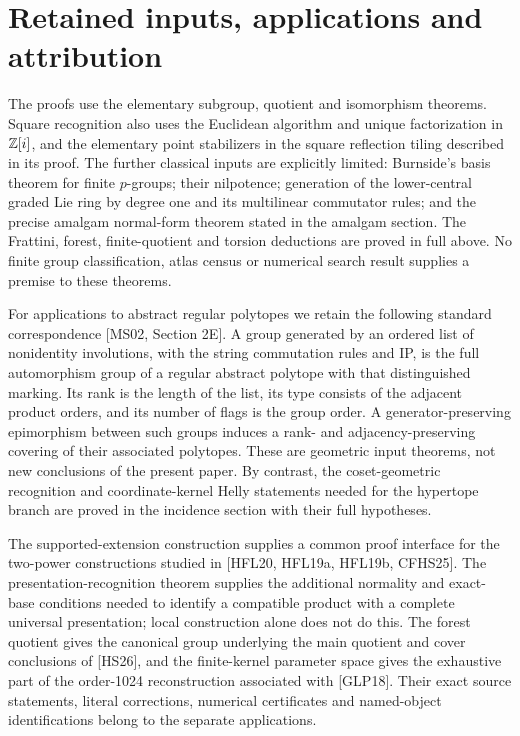 \section{Retained inputs, applications and attribution}\label{retained-inputs-applications-and-attribution}

The proofs use the elementary subgroup, quotient and isomorphism
theorems. Square recognition also uses the Euclidean algorithm and unique
factorization in $\mathbb Z[i]$, and the elementary point stabilizers in the
square reflection tiling described in its proof. The further classical
inputs are explicitly limited:
Burnside's basis theorem for finite \(p\)-groups; their nilpotence;
generation of the lower-central graded Lie ring by degree one and its
multilinear commutator rules; and the precise amalgam normal-form
theorem stated in the amalgam section. The Frattini, forest, finite-quotient and
torsion deductions are proved in full above. No finite group
classification, atlas census or numerical search result supplies a
premise to these theorems.

For applications to abstract regular polytopes we retain the following
standard correspondence {[}MS02, Section 2E{]}. A group generated by an
ordered list of nonidentity involutions, with the string commutation
rules and IP, is the full automorphism group of a regular abstract
polytope with that distinguished marking. Its rank is the length of the
list, its type consists of the adjacent product orders, and its number
of flags is the group order. A generator-preserving epimorphism between
such groups induces a rank- and adjacency-preserving covering of their
associated polytopes. These are geometric input theorems, not new
conclusions of the present paper. By contrast, the coset-geometric
recognition and coordinate-kernel Helly statements needed for the
hypertope branch are proved in the incidence section with their full hypotheses.

The supported-extension construction supplies a common proof interface
for the two-power constructions studied in {[}HFL20, HFL19a, HFL19b,
CFHS25{]}. The presentation-recognition theorem supplies the additional normality and
exact-base conditions needed to identify a compatible product with a complete
universal presentation; local construction alone does not do this.
The forest quotient gives the canonical group underlying the main
quotient and cover conclusions of {[}HS26{]}, and the finite-kernel
parameter space gives the exhaustive part of the order-1024
reconstruction associated with {[}GLP18{]}. Their exact source
statements, literal corrections, numerical certificates and named-object
identifications belong to the separate applications.

